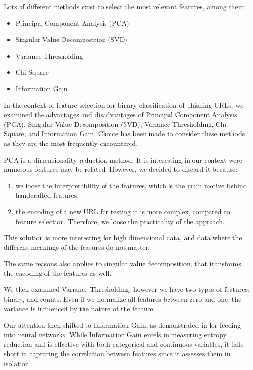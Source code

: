 \documentclass{article}
\begin{document}
    Lots of different methods exist to select the most relevant features, among them:
    \begin{itemize}
        \item Principal Component Analysis (PCA)
        \item Singular Value Decomposition (SVD)
        \item Variance Thresholding
        \item Chi-Square
        \item Information Gain
    \end{itemize}

    In the context of feature selection for binary classification of phishing URLs, we examined the advantages and disadvantages of Principal Component Analysis (PCA), Singular Value Decomposition (SVD), Variance Thresholding, Chi-Square, and Information Gain.
    Choice has been made to consider these methods as they are the most frequently encountered.

    PCA is a dimensionality reduction method.
    It is interesting in our context were numerous features may be related.
    However, we decided to discard it because:
    \begin{enumerate}
        \item we loose the interpretability of the features, which is the main motive behind handcrafted features.
        \item the encoding of a new URL for testing it is more complex, compared to feature selection.
        Therefore, we loose the practicality of the approach.
    \end{enumerate}
    This solution is more interesting for high dimensional data, and data where the different meanings of the features do not matter.

    The same reasons also applies to singular value decomposition, that transforms the encoding of the features as well.

    We then examined Variance Thresholding, however we have two types of features: binary, and counts.
    Even if we normalize all features between zero and one, the variance is influenced by the nature of the feature.

    Our attention then shifted to Information Gain, as demonstrated in\cite{EfficientDeepLearningPhishingDetection} for feeding into neural networks.
    While Information Gain excels in measuring entropy reduction and is effective with both categorical and continuous variables, it falls short in capturing the correlation between features since it assesses them in isolation.
\end{document}
